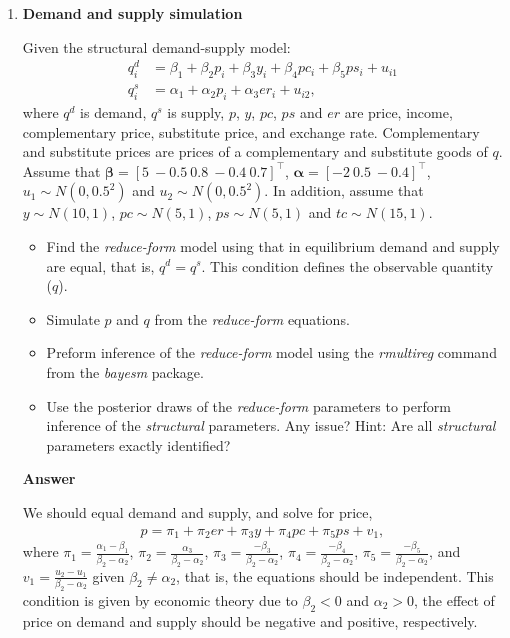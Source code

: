 \begin{enumerate}[leftmargin=*]
	\item \textbf{Demand and supply simulation}

Given the structural demand-supply model:
\begin{align*}
	q_i^d&=\beta_1+\beta_2p_i+\beta_3y_i+\beta_4pc_i+\beta_5ps_i+u_{i1}\\
	q_i^s&=\alpha_1+\alpha_2p_i+\alpha_3er_i+u_{i2},
\end{align*}
where $q^d$ is demand, $q^s$ is supply, $p$, $y$, $pc$, $ps$ and $er$ are price, income, complementary price, substitute price, and exchange rate. Complementary and substitute prices are prices of a complementary and substitute goods of $q$. Assume that $\bm{\beta}=\left[5 \ -0.5 \ 0.8 \ -0.4 \ 0.7\right]^{\top}$, $\bm{\alpha}=\left[-2 \ 0.5 \ -0.4\right]^{\top}$, $u_1\sim N(0, 0.5^2)$ and $u_2\sim N(0, 0.5^2)$. In addition, assume that $y\sim N(10,1)$, $pc\sim N(5,1)$, $ps\sim N(5,1)$ and $tc\sim N(15,1)$.
\begin{itemize}
	\item Find the \textit{reduce-form} model using that in equilibrium demand and supply are equal, that is, $q^d=q^s$. This condition defines the observable quantity ($q$).
	\item Simulate $p$ and $q$ from the \textit{reduce-form} equations.
	\item Preform inference of the \textit{reduce-form} model using the \textit{rmultireg} command from the \textit{bayesm} package.
	\item Use the posterior draws of the \textit{reduce-form} parameters to perform inference of the \textit{structural} parameters. Any issue? Hint: Are all \textit{structural} parameters exactly identified?   
\end{itemize}

\textbf{Answer}

We should equal demand and supply, and solve for price,
\begin{align*}
	p=\pi_1+\pi_2 er + \pi_3 y + \pi_4 pc + \pi_5 ps + v_1,
\end{align*}
where $\pi_1=\frac{\alpha_1-\beta_1}{\beta_2-\alpha_2}$, $\pi_2=\frac{\alpha_3}{\beta_2-\alpha_2}$, $\pi_3=\frac{-\beta_3}{\beta_2-\alpha_2}$, $\pi_4=\frac{-\beta_4}{\beta_2-\alpha_2}$, $\pi_5=\frac{-\beta_5}{\beta_2-\alpha_2}$, and $v_1=\frac{u_2-u_1}{\beta_2-\alpha_2}$ given $\beta_2\neq\alpha_2$, that is, the equations should be independent. This condition is given by economic theory due to $\beta_2<0$ and $\alpha_2>0$, the effect of price on demand and supply should be negative and positive, respectively.


\end{enumerate}
